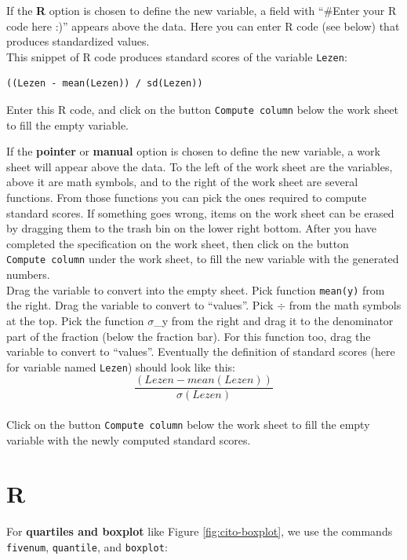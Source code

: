 \documentclass[
]{book}
\begin{document}
If the \textbf{R} option is chosen to define the new variable, a field with ``\#Enter your R code here :)'' appears above the data. Here you can enter R code (see below) that produces standardized values.\\
This snippet of R code produces standard scores of the variable \texttt{Lezen}:

\begin{verbatim}
((Lezen - mean(Lezen)) / sd(Lezen))
\end{verbatim}

Enter this R code, and click on the button \texttt{Compute\ column} below the work sheet to fill the empty variable.

If the \textbf{pointer} or \textbf{manual} option is chosen to define the new variable, a work sheet will appear above the data. To the left of the work sheet are the variables, above it are math symbols, and to the right of the work sheet are several functions. From those functions you can pick the ones required to compute standard scores. If something goes wrong, items on the work sheet can be erased by dragging them to the trash bin on the lower right bottom. After you have completed the specification on the work sheet, then click on the button \texttt{Compute\ column} under the work sheet, to fill the new variable with the generated numbers.\\
Drag the variable to convert into the empty sheet. Pick function \texttt{mean(y)} from the right.
Drag the variable to convert to ``values''. Pick \(\div\) from the math symbols at the top.
Pick the function \(\sigma\)\_y from the right and drag it to the denominator part of the fraction (below the fraction bar). For this function too, drag the variable to convert to ``values''.
Eventually the definition of standard scores (here for variable named \texttt{Lezen}) should look like this: \[\frac{(Lezen-mean(Lezen))}{\sigma (Lezen)}\]\\
Click on the button \texttt{Compute\ column} below the work sheet to fill the empty variable with the newly computed standard scores.

\hypertarget{r-3}{%
\section{R}\label{r-3}}

For \textbf{quartiles and boxplot} like Figure \ref{fig:cito-boxplot}, we use the commands \texttt{fivenum}, \texttt{quantile}, and \texttt{boxplot}:
\end{document}
